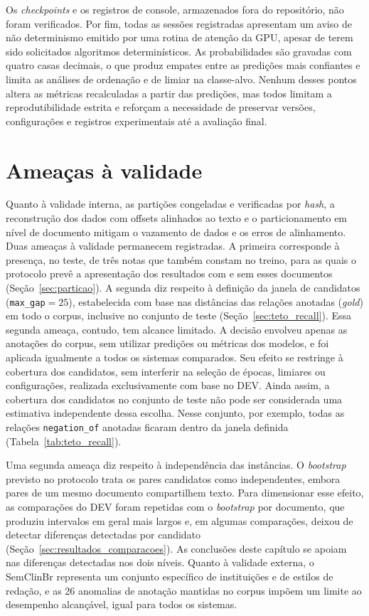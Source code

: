 Os \emph{checkpoints} e os registros de console, armazenados fora do repositório, não foram verificados. Por fim, todas as sessões registradas apresentam um aviso de não determinismo emitido por uma rotina de atenção da GPU, apesar de terem sido solicitados algoritmos determinísticos. As probabilidades são gravadas com quatro casas decimais, o que produz empates entre as predições mais confiantes e limita as análises de ordenação e de limiar na classe-alvo. Nenhum desses pontos altera as métricas recalculadas a partir das
predições, mas todos limitam a reprodutibilidade estrita e reforçam a necessidade de
preservar versões, configurações e registros experimentais até a avaliação final.

\section{Ameaças à validade}

Quanto à validade interna, as partições congeladas e verificadas por
\emph{hash}, a reconstrução dos dados com offsets alinhados ao texto e o
particionamento em nível de documento mitigam o vazamento de dados e os erros de
alinhamento. Duas ameaças à validade permanecem registradas. A primeira corresponde à presença, no teste, de três notas que também constam no treino, para as quais o protocolo prevê a apresentação dos resultados com e sem esses documentos (Seção~\ref{sec:particao}). A segunda diz respeito à definição da janela de candidatos (\texttt{max\_gap}$=25$), estabelecida com base nas distâncias das relações anotadas (\emph{gold}) em todo o corpus, inclusive no conjunto de teste (Seção~\ref{sec:teto_recall}). Essa segunda ameaça, contudo, tem alcance limitado. A decisão envolveu apenas as anotações do corpus, sem utilizar predições ou métricas dos modelos, e foi aplicada igualmente a todos os sistemas comparados. Seu efeito se restringe à cobertura dos candidatos, sem interferir na seleção de épocas, limiares ou configurações, realizada exclusivamente com base no DEV. Ainda assim, a cobertura dos candidatos no conjunto de teste não pode ser considerada uma estimativa independente dessa escolha. Nesse conjunto, por exemplo, todas as relações \texttt{negation\_of} anotadas ficaram dentro da janela definida (Tabela~\ref{tab:teto_recall}).

Uma segunda ameaça diz respeito à independência das instâncias. O \emph{bootstrap}
previsto no protocolo trata os pares candidatos como independentes, embora pares de
um mesmo documento compartilhem texto. Para dimensionar esse efeito, as comparações
do DEV foram repetidas com o \emph{bootstrap} por documento, que produziu intervalos
em geral mais largos e, em algumas comparações, deixou de detectar diferenças
detectadas por candidato (Seção~\ref{sec:resultados_comparacoes}). As conclusões
deste capítulo se apoiam nas diferenças detectadas nos dois níveis. Quanto à
validade externa, o SemClinBr representa um conjunto específico de instituições e de
estilos de redação, e as 26 anomalias de anotação mantidas no corpus impõem um limite
ao desempenho alcançável, igual para todos os sistemas.

